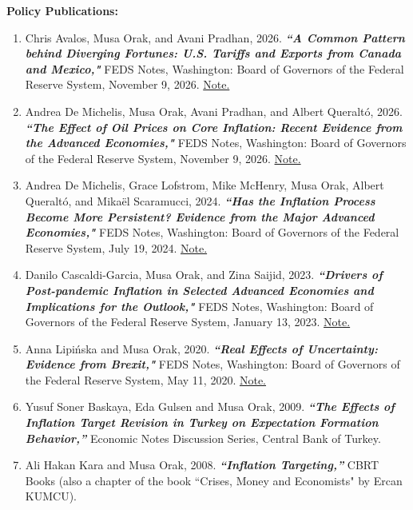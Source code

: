 \documentclass[10pt]{article}
\begin{document}
\textbf{Policy Publications:}  \smallskip
\begin{enumerate}

\item Chris Avalos, Musa Orak, and Avani Pradhan, 2026. \textit{\textbf{``A Common Pattern behind Diverging Fortunes: U.S. Tariffs and Exports from Canada and Mexico,"}} FEDS Notes, Washington: Board of Governors of the Federal Reserve System, November 9, 2026. \href{https://www.federalreserve.gov/econres/notes/feds-notes/a-common-pattern-behind-diverging-fortunes-u-s-tariffs-and-exports-from-canada-and-mexico-20261109.html}{Note.}

\item Andrea De Michelis, Musa Orak, Avani Pradhan, and Albert Queraltó, 2026. \textit{\textbf{``The Effect of Oil Prices on Core Inflation: Recent Evidence from the Advanced Economies,"}} FEDS Notes, Washington: Board of Governors of the Federal Reserve System, November 9, 2026. \href{https://www.federalreserve.gov/econres/notes/feds-notes/the-effect-of-oil-prices-on-core-inflation-recent-evidence-from-the-advanced-economies-20261109.html}{Note.}

\item Andrea De Michelis, Grace Lofstrom, Mike McHenry, Musa Orak, Albert Queraltó, and Mikaël Scaramucci, 2024. \textit{\textbf{``Has the Inflation Process Become More Persistent? Evidence from the Major Advanced Economies,"}} FEDS Notes, Washington: Board of Governors of the Federal Reserve System, July 19, 2024. \href{https://doi.org/10.17016/2380-7172.3562}{Note.}

\item Danilo Cascaldi-Garcia, Musa Orak, and Zina Saijid, 2023. \textit{\textbf{``Drivers of Post-pandemic Inflation in Selected Advanced Economies and Implications for the Outlook,"}} FEDS Notes, Washington: Board of Governors of the Federal Reserve System, January 13, 2023. \href{https://doi.org/10.17016/2380-7172.3232}{Note.}

\item Anna Lipińska and Musa Orak, 2020. \textit{\textbf{``Real Effects of Uncertainty: Evidence from Brexit,"}} FEDS Notes, Washington: Board of Governors of the Federal Reserve System, May 11, 2020. \href{https://doi.org/10.17016/2380-7172.2536}{Note.}


\item Yusuf Soner Baskaya, Eda Gulsen and Musa Orak, 2009. \textit{\textbf{``The Effects of Inflation Target Revision in Turkey on Expectation Formation Behavior,''}} Economic Notes Discussion Series, Central Bank of Turkey. \medskip

\item Ali Hakan Kara and Musa Orak, 2008. \textit{\textbf{``Inflation Targeting,''}} CBRT Books (also a chapter of the book ``Crises, Money and Economists" by Ercan KUMCU). \medskip
\end{enumerate}
\end{document}
